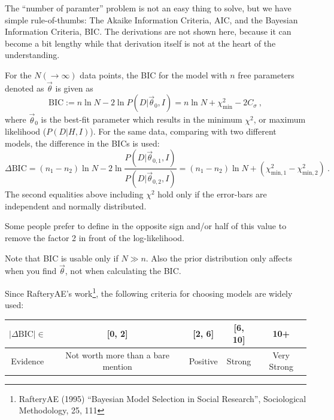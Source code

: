 The ``number of paramter'' problem is not an easy thing to solve, but we have simple rule-of-thumbs: The Akaike Information Criteria, AIC, and the Bayesian Information Criteria, BIC. The derivations are not shown here, because it can become a bit lengthy while that derivation itself is not at the heart of the understanding.

\begin{thm}
For the $ N (\rightarrow \infty) $ data points, the BIC for the model with $ n $ free parameters denoted as $ \vec{\theta} $ is given as
\begin{equation}\label{eq: bic}
  \mathrm{BIC} := n \ln N - 2 \ln P(D|\vec{\theta}_0, I) = n \ln N + \chi^2_\mathrm{min} - 2C_\sigma ~,
\end{equation}
where $ \vec{\theta}_0 $ is the best-fit parameter which results in the minimum $ \chi^2 $, or maximum likelihood ($ P(D|H, I) $).
For the same data, comparing with two different models, the difference in the BICs is used:
\begin{equation}\label{eq: dbic}
  \Delta \mathrm{BIC} 
    = (n_1 - n_2) \ln N 
      - 2 \ln \frac{P(D|\vec{\theta}_{0, 1}, I)}{P(D|\vec{\theta}_{0, 2}, I)}
    = (n_1 - n_2) \ln N 
      + (\chi^2_\mathrm{min, 1} - \chi^2_\mathrm{min, 2}) ~.
\end{equation}
The second equalities above including $ \chi^2 $ hold only if the error-bars are independent and normally distributed.

Some people prefer to define in the opposite sign and/or half of this value to remove the factor 2 in front of the log-likelihood.
\end{thm}
Note that BIC is usable only if $ N \gg n $. Also the prior distribution only affects when you find $ \vec{\theta} $, not when calculating the BIC. 

Since RafteryAE's work\footnote{RafteryAE (1995) ``Bayesian Model Selection in Social Research'', Sociological Methodology, 25, 111}, the following criteria for choosing models are widely used:

\begin{table}[ht!]
\centering
\label{tab: bic}
\begin{tabular}{|c|c|c|c|c|}
  \hline 
  $ |\Delta\mathrm{BIC}| \in $ & [0, 2] & [2, 6] & [6, 10] & 10+ \\ 
  \hline 
  Evidence & Not worth more than a bare mention & Positive & Strong & Very Strong \\ 
  \hline 
\end{tabular}  
\end{table}


